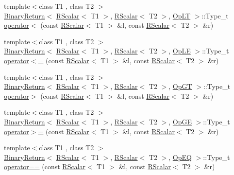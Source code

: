 \begin{DoxyCompactItemize}
\item 
{\footnotesize template$<$class T1 , class T2 $>$ }\\\mbox{\hyperlink{structENSEM_1_1BinaryReturn}{Binary\+Return}}$<$ \mbox{\hyperlink{classENSEM_1_1RScalar}{R\+Scalar}}$<$ T1 $>$, \mbox{\hyperlink{classENSEM_1_1RScalar}{R\+Scalar}}$<$ T2 $>$, \mbox{\hyperlink{structENSEM_1_1OpLT}{Op\+LT}} $>$\+::Type\+\_\+t \mbox{\hyperlink{group__rscalar_gaa8cbddeaf30b9bc34c8cca497a259805}{operator$<$}} (const \mbox{\hyperlink{classENSEM_1_1RScalar}{R\+Scalar}}$<$ T1 $>$ \&l, const \mbox{\hyperlink{classENSEM_1_1RScalar}{R\+Scalar}}$<$ T2 $>$ \&r)
\item 
{\footnotesize template$<$class T1 , class T2 $>$ }\\\mbox{\hyperlink{structENSEM_1_1BinaryReturn}{Binary\+Return}}$<$ \mbox{\hyperlink{classENSEM_1_1RScalar}{R\+Scalar}}$<$ T1 $>$, \mbox{\hyperlink{classENSEM_1_1RScalar}{R\+Scalar}}$<$ T2 $>$, \mbox{\hyperlink{structENSEM_1_1OpLE}{Op\+LE}} $>$\+::Type\+\_\+t \mbox{\hyperlink{group__rscalar_ga17ac158bc4a28aed7618e341087e8084}{operator$<$=}} (const \mbox{\hyperlink{classENSEM_1_1RScalar}{R\+Scalar}}$<$ T1 $>$ \&l, const \mbox{\hyperlink{classENSEM_1_1RScalar}{R\+Scalar}}$<$ T2 $>$ \&r)
\item 
{\footnotesize template$<$class T1 , class T2 $>$ }\\\mbox{\hyperlink{structENSEM_1_1BinaryReturn}{Binary\+Return}}$<$ \mbox{\hyperlink{classENSEM_1_1RScalar}{R\+Scalar}}$<$ T1 $>$, \mbox{\hyperlink{classENSEM_1_1RScalar}{R\+Scalar}}$<$ T2 $>$, \mbox{\hyperlink{structENSEM_1_1OpGT}{Op\+GT}} $>$\+::Type\+\_\+t \mbox{\hyperlink{group__rscalar_ga7e63d3683975042d12f1fb51499b95ff}{operator$>$}} (const \mbox{\hyperlink{classENSEM_1_1RScalar}{R\+Scalar}}$<$ T1 $>$ \&l, const \mbox{\hyperlink{classENSEM_1_1RScalar}{R\+Scalar}}$<$ T2 $>$ \&r)
\item 
{\footnotesize template$<$class T1 , class T2 $>$ }\\\mbox{\hyperlink{structENSEM_1_1BinaryReturn}{Binary\+Return}}$<$ \mbox{\hyperlink{classENSEM_1_1RScalar}{R\+Scalar}}$<$ T1 $>$, \mbox{\hyperlink{classENSEM_1_1RScalar}{R\+Scalar}}$<$ T2 $>$, \mbox{\hyperlink{structENSEM_1_1OpGE}{Op\+GE}} $>$\+::Type\+\_\+t \mbox{\hyperlink{group__rscalar_ga48e571bcedcc6e54b313673e6c64b759}{operator$>$=}} (const \mbox{\hyperlink{classENSEM_1_1RScalar}{R\+Scalar}}$<$ T1 $>$ \&l, const \mbox{\hyperlink{classENSEM_1_1RScalar}{R\+Scalar}}$<$ T2 $>$ \&r)
\item 
{\footnotesize template$<$class T1 , class T2 $>$ }\\\mbox{\hyperlink{structENSEM_1_1BinaryReturn}{Binary\+Return}}$<$ \mbox{\hyperlink{classENSEM_1_1RScalar}{R\+Scalar}}$<$ T1 $>$, \mbox{\hyperlink{classENSEM_1_1RScalar}{R\+Scalar}}$<$ T2 $>$, \mbox{\hyperlink{structENSEM_1_1OpEQ}{Op\+EQ}} $>$\+::Type\+\_\+t \mbox{\hyperlink{group__rscalar_ga7c4b4d964b61ea096a84dc01a77fee5b}{operator==}} (const \mbox{\hyperlink{classENSEM_1_1RScalar}{R\+Scalar}}$<$ T1 $>$ \&l, const \mbox{\hyperlink{classENSEM_1_1RScalar}{R\+Scalar}}$<$ T2 $>$ \&r)

\end{DoxyCompactItemize}
